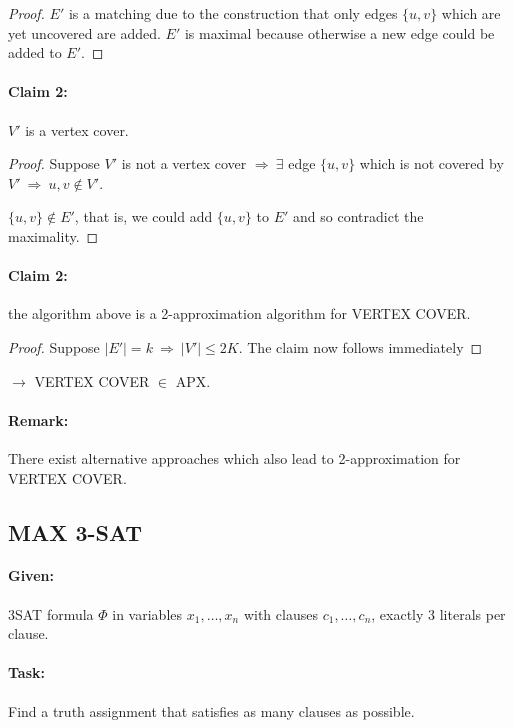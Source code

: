 \documentclass[11pt]{article}
\theoremstyle{definition}
\theoremstyle{definition}
\begin{document}
\begin{proof}
$ E' $ is a matching due to the construction that only edges $ \{u, v\} $ which are yet uncovered are added. $ E' $ is maximal because otherwise a new edge could be added to $ E' $.
\end{proof}

\paragraph{Claim 2:} $ V' $ is a vertex cover.

\begin{proof}
Suppose $ V' $ is not a vertex cover $ \Rightarrow ~ \exists $ edge $ \{u, v\} $ which is not covered by $ V' ~ \Rightarrow ~ u, v \not \in V' $.

$ \{u, v\} \not \in E' $, that is, we could add $ \{u, v\} $ to $ E' $ and so contradict the maximality.
\end{proof}

\paragraph{Claim 2:} the algorithm above is a 2-approximation algorithm for VERTEX COVER.

\begin{proof}
Suppose $ | E' | = k ~ \Rightarrow ~ | V' | \leq 2K $. The claim now follows immediately
\end{proof}


$ \rightarrow $ VERTEX COVER $ \in $ APX.


\paragraph{Remark:} There exist alternative approaches which also lead to 2-approximation for VERTEX COVER.

\subsection{MAX 3-SAT}

\paragraph{Given:} 3SAT formula $ \Phi $ in variables $ x_1, \dots, x_n $ with clauses $ c_1, \dots, c_n $, exactly 3 literals per clause.

\paragraph{Task:} Find a truth assignment that satisfies as many clauses as possible.
\end{document}
